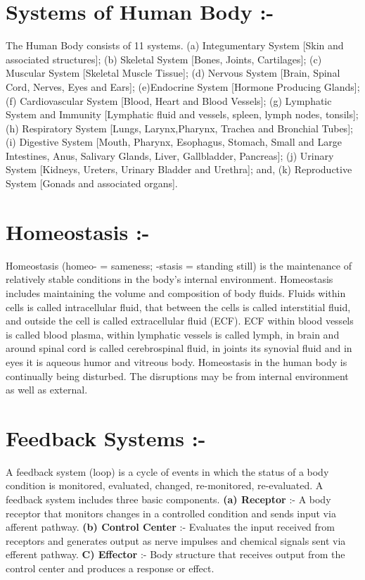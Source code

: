 \documentclass[12pt]{article}
\begin{document}
\begin{small}
\section{Systems of Human Body :-}
The Human Body consists of 11 systems. (a) Integumentary System [Skin and associated structures]; (b) Skeletal System [Bones, Joints, Cartilages]; (c) Muscular System [Skeletal Muscle Tissue]; (d) Nervous System [Brain, Spinal Cord, Nerves, Eyes and Ears]; (e)Endocrine System [Hormone Producing Glands]; (f) Cardiovascular System [Blood, Heart and Blood Vessels]; (g) Lymphatic System and Immunity [Lymphatic fluid and vessels, spleen, lymph nodes, tonsils]; (h) Respiratory System [Lungs, Larynx,Pharynx, Trachea and Bronchial Tubes]; (i) Digestive System [Mouth, Pharynx, Esophagus, Stomach, Small and Large Intestines, Anus, Salivary Glands, Liver, Gallbladder, Pancreas]; (j) Urinary System [Kidneys, Ureters, Urinary Bladder and Urethra]; and, (k) Reproductive System [Gonads and associated organs]. 

\section{Homeostasis :- }
Homeostasis (homeo- = sameness; -stasis = standing still) is the maintenance of relatively stable conditions in the body's internal environment.
\linebreak
Homeostasis includes maintaining the volume and composition of body fluids. Fluids within cells is called intracellular fluid, that between the cells is called interstitial fluid, and outside the cell is called extracellular fluid (ECF). 
\linebreak
ECF within blood vessels is called blood plasma, within lymphatic vessels is called lymph, in brain and around spinal cord is called cerebrospinal fluid, in joints its synovial fluid and in eyes it is aqueous humor and vitreous body.
\linebreak
Homeostasis in the human body is continually being disturbed. The disruptions may be from internal environment as well as external.

\section{Feedback Systems :- }
A feedback system (loop) is a cycle of events in which the status of a body condition is monitored, evaluated, changed, re-monitored, re-evaluated. A feedback system includes three basic components.
\linebreak 
\textbf{(a) Receptor} :- A body receptor that monitors changes in a controlled condition and sends input via afferent pathway.
\linebreak
\textbf{(b) Control Center} :- Evaluates the input received from receptors and generates output as nerve impulses and chemical signals sent via efferent pathway.
\linebreak
\textbf{C) Effector} :- Body structure that receives output from the control center and produces a response or effect.

\end{small}
\end{document}
